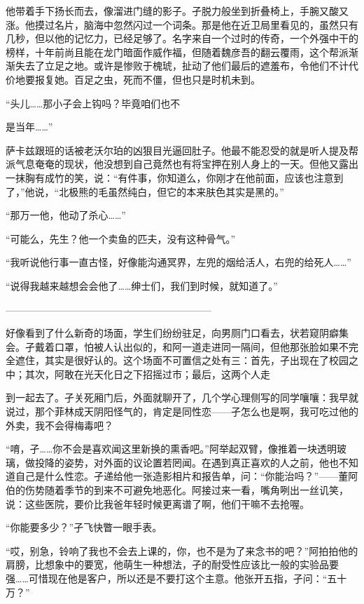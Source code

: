 \documentclass{article}
\begin{document}
他带着手下扬长而去，像溜进门缝的影子。孑脱力般坐到折叠椅上，手腕又酸又涨。他摸过名片，脑海中忽然闪过一个词条。那是他在近卫局里看见的，虽然只有几秒，但以他的记忆力，已经足够了。名字来自一个过时的传奇，一个外强中干的榜样，十年前尚且能在龙门暗面作威作福，但随着魏彦吾的翻云覆雨，这个帮派渐渐失去了立足之地。或许是惨败于槐琥，扯动了他们最后的遮羞布，令他们不计代价地要报复她。百足之虫，死而不僵，但也只是时机未到。

“头儿……那小子会上钩吗？毕竟咱们也不

\newpage 

是当年……”

萨卡兹跟班的话被老沃尔珀的凶狠目光逼回肚子。他最不能忍受的就是听人提及帮派气息奄奄的现状，他没想到自己竟然也有将宝押在别人身上的一天。但他又露出一抹胸有成竹的笑，说：“有件事，你知道么，你刚才在他前面，应该也注意到了，”他说，“北极熊的毛虽然纯白，但它的本来肤色其实是黑的。”

“那万一他，他动了杀心……”

“可能么，先生？他一个卖鱼的匹夫，没有这种骨气。”

“我听说他行事一直古怪，好像能沟通冥界，左兜的烟给活人，右兜的给死人……”

“说得我越来越想会会他了……绅士们，我们到时候，就知道了。”

—————————————————————

好像看到了什么新奇的场面，学生们纷纷驻足，向男厕门口看去，状若窥阴癖集会。孑戴着口罩，怕被人认出似的，和阿一道走进同一隔间，但他那张脸如果不完全遮住，其实是很好认的。这个场面不可置信之处有三：首先，孑出现在了校园之中；其次，阿敢在光天化日之下招摇过市；最后，这两个人走

\newpage 

到一起去了。孑关死厢门后，外面就聊开了，几个学心理侧写的同学嚷嚷：我早就说过，那个菲林成天阴阳怪气的，肯定是同性恋——孑怎么也是啊，我可吃过他的外卖，我不会得梅毒吧？

“唷，孑……你不会是喜欢闻这里新换的熏香吧。”阿举起双臂，像推着一块透明玻璃，做投降的姿势，对外面的议论置若罔闻。在遇到真正喜欢的人之前，他也不知道自己是什么性恋。孑递给他一张造影相片和报告单，问：“你能治吗？”——董阿伯的伤势随着季节的到来不可避免地恶化。阿接过来一看，嘴角咧出一丝讥笑，说：这些医院，要价比我爸年轻时候更离谱了啊，他们干嘛不去抢喔。

“你能要多少？”孑飞快瞥一眼手表。

“哎，别急，铃响了我也不会去上课的，你，也不是为了来念书的吧？”阿拍拍他的肩膀，比想象中的要宽，他萌生一种想法，孑的耐受性应该比一般的实验品要强……可惜现在他是客户，所以还是不要打这个主意。他张开五指，孑问：“五十万？”
\end{document}
